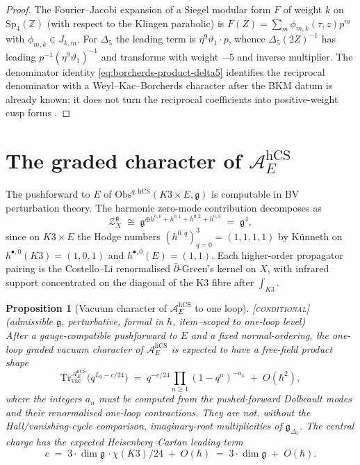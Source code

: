 \documentclass[11pt]{amsart}
\providecommand{\Z}{\mathbb{Z}}
\providecommand{\cA}{\mathcal{A}}
\providecommand{\cZ}{\mathcal{Z}}
\providecommand{\dbar}{\bar{\partial}}
\providecommand{\frakg}{\mathfrak{g}}
\providecommand{\Sp}{\mathrm{Sp}}
\providecommand{\Tr}{\mathrm{Tr}}
\providecommand{\Obs}{\mathrm{Obs}}
\providecommand{\hCS}{\mathrm{hCS}}
\providecommand{\Gdelta}{\mathfrak{g}_{\Delta_{5}}}
\providecommand{\ClaimStatusConditional}{\textsc{[conditional]}}
\theoremstyle{plain}
\newtheorem{proposition}[theorem]{Proposition}
\theoremstyle{definition}
\theoremstyle{remark}
\begin{document}
\begin{proof}
The Fourier--Jacobi expansion of a Siegel modular form
$F$ of weight $k$ on $\Sp_{4}(\Z)$ (with respect to the Klingen
parabolic) is $F(Z)=\sum_{m}\phi_{m,k}(\tau,z)p^{m}$ with
$\phi_{m,k}\in J_{k,m}$. For $\Delta_{5}$ the leading term is
$\eta^{9}\vartheta_{1}\cdot p$, whence $\Delta_{5}(2Z)^{-1}$ has leading
$p^{-1}(\eta^{9}\vartheta_{1})^{-1}$ and transforms with weight $-5$
and inverse multiplier. The denominator identity
\eqref{eq:borcherds-product-delta5} identifies the reciprocal
denominator with a Weyl--Kac--Borcherds character after the BKM datum is
already known; it does not turn the reciprocal coefficients into
positive-weight cusp forms
\cite{Borcherds1998,GritsenkoNikulin1995}.
\end{proof}

\section{The graded character of $\cA_{E}^{\hCS}$}
\label{sec:graded-char-AE-hcs}

The pushforward to $E$ of $\Obs^{q,\hCS}(K3\times E,\frakg)$ is
computable in BV perturbation theory. The harmonic zero-mode
contribution decomposes as
\[
\cZ_{X}^{\frakg}
\;\cong\;
\frakg^{\oplus h^{0,0}+h^{0,1}+h^{0,2}+h^{0,3}}
\;=\;
\frakg^{4},
\]
since on $K3\times E$ the Hodge numbers $(h^{0,q})_{q=0}^{3}=(1,1,1,1)$
by K\"unneth on $h^{\bullet,0}(K3)=(1,0,1)$ and $h^{\bullet,0}(E)=(1,1)$.
Each higher-order propagator pairing is the Costello--Li renormalised
$\dbar$-Green's kernel on $X$, with infrared support concentrated on the
diagonal of the K3 fibre after $\int_{K3}$.

\begin{proposition}[Vacuum character of $\cA_{E}^{\hCS}$ to one loop]
\label{prop:vacuum-char-AE-one-loop}
\ClaimStatusConditional{}\textup{(}admissible $\frakg$, perturbative,
formal in $\hbar$, item--scoped to one-loop level\textup{)}\\
After a gauge-compatible pushforward to $E$ and a fixed
normal-ordering, the one-loop graded vacuum character of
$\cA_{E}^{\hCS}$ is expected to have a free-field product shape
\[
\Tr_{\mathrm{vac}}^{\cA_{E}^{\hCS}}\bigl(q^{L_{0}-c/24}\bigr)
\;=\;
q^{-c/24}\prod_{n\geq 1}(1-q^{n})^{-a_{n}}
\;+\;O(\hbar^{2}),
\]
where the integers $a_n$ must be computed from the pushed-forward
Dolbeault modes and their renormalised one-loop contractions. They are
not, without the Hall/vanishing-cycle comparison, imaginary-root
multiplicities of $\Gdelta$. The central charge has the expected
Heisenberg--Cartan leading term
\[
c \;=\; 3\cdot\dim\frakg\,\cdot \chi(K3)/24 \;+\; O(\hbar)
\;=\;
3\cdot\dim\frakg \;+\; O(\hbar).
\]
\end{proposition}
\end{document}
